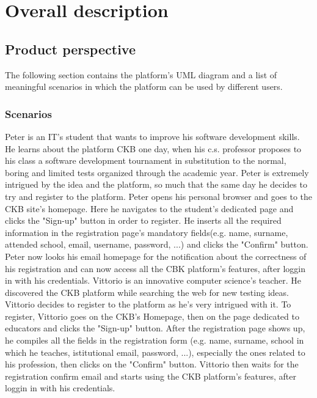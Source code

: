 \documentclass{article}
\newcounter{subsubsubsection}[subsubsection]
\begin{document}
{\newpage

\pagestyle{OverallDescriptionStyle}

\section{Overall description}
\subsection{Product perspective}
The following section contains the platform's UML diagram and a list of meaningful 
scenarios in which the platform can be used by different users.
\subsubsection{Scenarios}
Peter is an IT's student that wants to improve his software development skills. 
He learns about the platform CKB one day, when his c.s. professor proposes to his class a software development tournament 
in substitution to the normal, boring and limited tests organized through the academic year.
Peter is extremely intrigued by the idea and the platform, so much that the same day he decides to try and register to the platform.
Peter opens his personal browser and goes to the CKB site's homepage. Here he navigates to the student's dedicated page and clicks the 
"Sign-up" button in order to register. 
He inserts all the required information in the registration page's mandatory fields(e.g. name, surname, attended school, email, username, password, ...)
 and clicks the "Confirm" button.
Peter now looks his email homepage for the notification about the correctness of his registration 
and can now access all the CBK platform's features, after loggin in with his credentials.
Vittorio is an innovative computer science's teacher. 
He discovered the CKB platform while searching the web for new testing ideas.
Vittorio decides to register to the platform as he's very intrigued with it. 
To register, Vittorio goes on the CKB's Homepage, then on the page dedicated to educators and clicks the "Sign-up" button.
 After the registration page shows up, he compiles all the fields in the registration form (e.g. name, surname, school in which he teaches, istitutional email, password, ...), 
 especially the ones related to his profession, then clicks on the "Confirm" button.
Vittorio then waits for the registration confirm email and starts using the CKB platform's features, after loggin in with his credentials.
}
\end{document}
